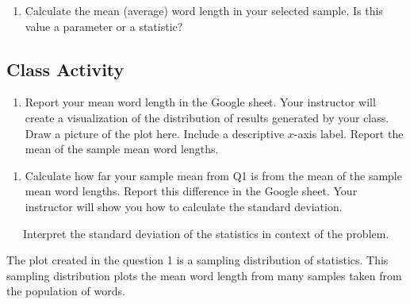 \documentclass[
]{report}
\providecommand{\tightlist}{%
  \setlength{\itemsep}{0pt}\setlength{\parskip}{0pt}}
\begin{document}
\begin{enumerate}
\def\labelenumi{\arabic{enumi}.}
\setcounter{enumi}{2}
\tightlist
\item
  Calculate the mean (average) word length in your selected sample. Is this value a parameter or a statistic?\\
  \vspace{0.3in}
\end{enumerate}

\subsection{Class Activity}\label{class-activity}

\begin{enumerate}
\def\labelenumi{\arabic{enumi}.}
\tightlist
\item
  Report your mean word length in the Google sheet. Your instructor will create a visualization of the distribution of results generated by your class. Draw a picture of the plot here. Include a descriptive \(x\)-axis label. Report the mean of the sample mean word lengths.
\end{enumerate}

\vspace{2in}

\newpage

\begin{enumerate}
\def\labelenumi{\arabic{enumi}.}
\setcounter{enumi}{1}
\tightlist
\item
  Calculate how far your sample mean from Q1 is from the mean of the sample mean word lengths. Report this difference in the Google sheet. Your instructor will show you how to calculate the standard deviation.
\end{enumerate}

\vspace{1in}

~~~Interpret the standard deviation of the statistics in context of the problem.

\vspace{0.8in}

The plot created in the question 1 is a sampling distribution of statistics. This sampling distribution plots the mean word length from many samples taken from the population of words.
\end{document}
